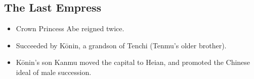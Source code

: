\documentclass[class=article, crop=false]{standalone}
\begin{document}
  \subsection{The Last Empress}
  \begin{itemize}
    \item Crown Princess Abe reigned twice.
    \item Succeeded by K\=onin, a grandson of Tenchi (Tenmu's older brother).
    \item K\=onin's son Kanmu moved the capital to Heian, and promoted the Chinese ideal of male succession.
  \end{itemize}
\end{document}
